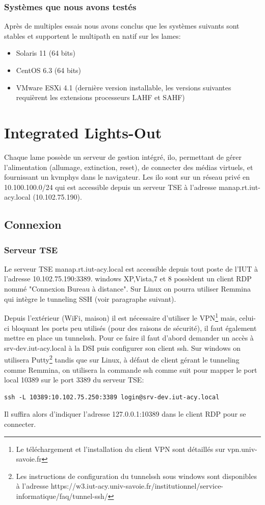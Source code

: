 \documentclass[a4paper,oneside]{report}
\begin{document}
\subsubsection{Systèmes que nous avons testés}
Après de multiples essais nous avons conclus que les systèmes suivants sont stables et supportent le multipath en natif sur les lames:
\begin{itemize}
\item Solaris 11 (64 bits)
\item CentOS 6.3 (64 bits)
\item VMware ESXi 4.1 (dernière version installable, les versions suivantes requièrent les extensions processeurs LAHF et SAHF)
\end{itemize}

\section{Integrated Lights-Out}
Chaque lame possède un serveur de gestion intégré, \gls{ilo}, permettant de gérer l'alimentation (allumage, extinction, reset), de connecter des médias virtuels, et fournissant un \gls{kvmphys} dans le navigateur.
Les \gls{ilo} sont sur un réseau privé en 10.100.100.0/24 qui est accessible depuis un serveur TSE à l'adresse manap.rt.iut-acy.local (10.102.75.190).

\subsection{Connexion}
\subsubsection{Serveur TSE}
Le serveur TSE manap.rt.iut-acy.local est accessible depuis tout poste de l'IUT à l'adresse 10.102.75.190:3389. \gls{windows} XP,Vista,7 et 8 possèdent un client RDP nommé "Connexion Bureau à distance". Sur Linux on pourra utiliser Remmina qui intègre le tunneling SSH (voir paragraphe suivant).


Depuis l'extérieur (WiFi, maison) il est nécessaire d'utiliser le VPN\footnote{Le téléchargement et l'installation du client VPN sont détaillés sur vpn.univ-savoie.fr} mais, celui-ci bloquant les ports peu utilisés (pour des raisons de sécurité), il faut également mettre en place un \gls{tunnelssh}.
Pour ce faire il faut d'abord demander un accès à srv-dev.iut-acy.local à la DSI puis configurer son client \gls{ssh}.\newline
Sur \gls{windows} on utilisera Putty\footnote{Les instructions de configuration du \gls{tunnelssh} sous \gls{windows} sont disponibles à l'adresse https://w3.iut-acy.univ-savoie.fr/institutionnel/service-informatique/faq/tunnel-ssh/} tandis que sur Linux, à défaut de client gérant le tunneling comme Remmina, on utilisera la commande ssh comme suit pour mapper le port local 10389 sur le port 3389 du serveur TSE:
\label{tunnelingSsh}
\begin{verbatim}
ssh -L 10389:10.102.75.250:3389 login@srv-dev.iut-acy.local
\end{verbatim}
Il suffira alors d'indiquer l'adresse 127.0.0.1:10389 dans le client RDP pour se connecter.
\end{document}
